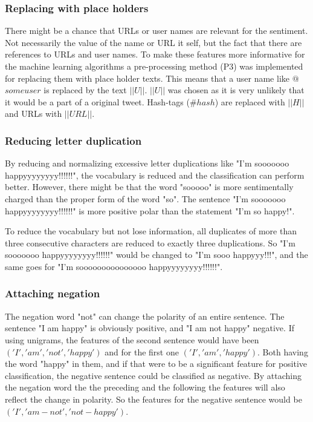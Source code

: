 \subsubsection{Replacing with place holders}
There might be a chance that URLs or user names are relevant for the sentiment. Not necessarily the value of the name or URL it self, but the fact that there are references to URLs and user names. To make these features more informative for the machine learning algorithms a pre-processing method (P3) was implemented for replacing them with place holder texts. This means that a user name like $@$$someuser$ is replaced by the text $||U||$. $||U||$ was chosen as it is very unlikely that it would be a part of a original tweet. Hash-tags ($\#hash$) are replaced with $||H||$ and URLs with $||URL||$. 

\subsubsection{Reducing letter duplication}
By reducing and normalizing excessive letter duplications like "I'm sooooooo happyyyyyyyy!!!!!!", the vocabulary is reduced and the classification can perform better. However, there might be that the word "sooooo" is more sentimentally charged than the proper form of the word "so". The sentence "I'm sooooooo happyyyyyyyy!!!!!!" is more positive polar than the statement "I'm so happy!". 

To reduce the vocabulary but not lose information, all duplicates of more than three consecutive characters are reduced to exactly three duplications. So "I'm sooooooo happyyyyyyyy!!!!!!" would be changed to "I'm sooo happyyy!!!", and the same goes for "I'm sooooooooooooooo happyyyyyyyy!!!!!!".

\subsubsection{Attaching negation}
The negation word "not" can change the polarity of an entire sentence. The sentence "I am happy" is obviously positive, and "I am not happy" negative. If using unigrams, the features of the second sentence would have been $('I', 'am', 'not', 'happy')$ and for the first one $('I', 'am', 'happy')$. Both having the word "happy" in them, and if that were to be a significant feature for positive classification, the negative sentence could be classified as negative. 
By attaching the negation word the the preceding and the following the features will also reflect the change in polarity. So the features for the negative sentence would be $('I', 'am-not', 'not-happy')$.

